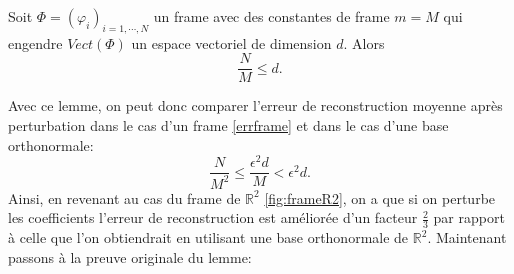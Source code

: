 \begin{lemme}\label{th:dimFrame}
	Soit $\Phi =(\varphi_i)_{i=1, \cdots, N}$ un frame avec des constantes de frame $m=M$ qui engendre $Vect(\Phi)$ un espace vectoriel de dimension $d$.
	Alors
	\begin{equation}
		\frac{N}{M} \leq d.
	\end{equation}
\end{lemme}
Avec ce lemme, on peut donc comparer l'erreur de reconstruction moyenne après perturbation dans le cas d'un frame \ref{errframe} et dans le cas d'une base orthonormale:
\begin{equation}
	\frac{N}{M^2} \leq \frac{\epsilon^2d}{M} < \epsilon^2 d.
\end{equation}
Ainsi, en revenant au cas du frame de $\mathbb{R}^2$ \ref{fig:frameR2}, on a que si on perturbe les coefficients l'erreur de reconstruction est améliorée d'un facteur $\frac{2}{3}$ par rapport à celle que l'on obtiendrait en utilisant une base orthonormale de $\mathbb{R}^2$.
Maintenant passons à la preuve originale du lemme:
